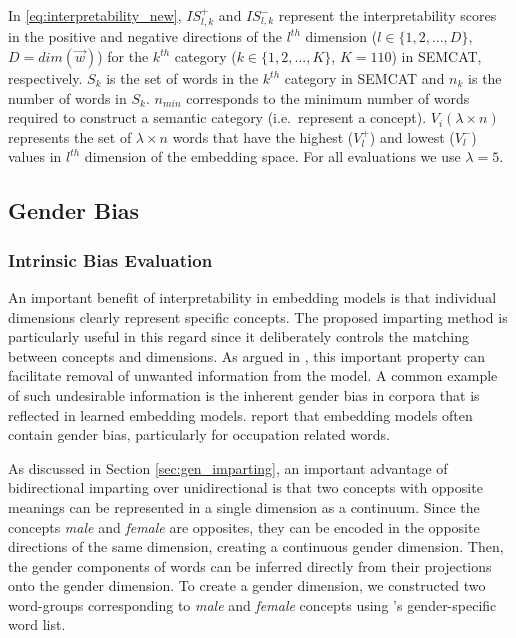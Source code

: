 \documentclass[11pt,a4paper]{article}
\begin{document}
In \eqref{eq:interpretability_new}, $IS^+_{l,k}$ and $IS^-_{l,k}$ represent the interpretability scores in the positive and negative directions of the $l^{th}$ dimension ($l \in \{1,2,...,D\}$, $D=dim(\vec{w})$) for the $k^{th}$ category ($k \in \{1,2,...,K\}$, $K=110$) in SEMCAT, respectively. $S_k$ is the set of words in the $k^{th}$ category in SEMCAT and $n_k$ is the number of words in $S_k$. $n_{min}$ corresponds to the minimum number of words required to construct a semantic category (i.e.\ represent a concept). $V_i(\lambda \times n)$ represents the set of $\lambda \times n$ words that have the highest ($V_l^+$) and lowest ($V_l^-$) values in $l^{th}$ dimension of the embedding space. For all evaluations we use $\lambda=5$.


\subsection{Gender Bias} \label{sec:gender_bias}
 
\subsubsection{Intrinsic Bias Evaluation}
 
An important benefit of interpretability in embedding models is that individual dimensions clearly represent specific concepts. The proposed imparting method is particularly useful in this regard since it deliberately controls the matching between concepts and dimensions. As argued in \citep{dufter19ultraDense}, this important property can facilitate removal of unwanted information from the model. A common example of such undesirable information is the inherent gender bias in corpora that is reflected in learned embedding models. \citet{bolukbasi16debiasing} report that embedding models often contain gender bias,  particularly  for occupation related words. 

As discussed in Section \ref{sec:gen_imparting}, an
important advantage of bidirectional imparting over
unidirectional is that two concepts with opposite meanings
can be represented in a single dimension as a
continuum. Since the concepts \textit{male} and
\textit{female} are opposites, they can be encoded in the
opposite directions of the same dimension, creating a
continuous gender dimension. Then, the gender components of
words can be inferred directly from their projections onto
the gender dimension. To create a gender dimension,
we constructed two word-groups corresponding to
\textit{male} and \textit{female} concepts using
\citep{bolukbasi16debiasing}'s gender-specific word list. 
\end{document}
